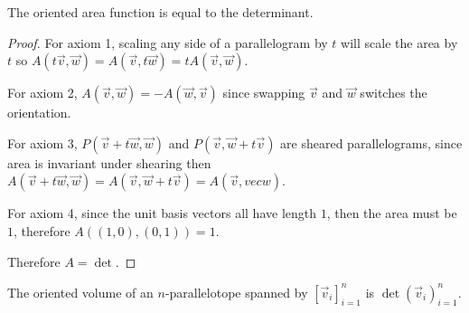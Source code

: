 \documentclass[notes]{subfiles}
\begin{document}
\begin{lemma}
    The oriented area function is equal to the determinant.
\end{lemma}
\begin{proof}
    For axiom 1, scaling any side of a parallelogram by $t$ will scale the area by $t$ so $A(t\vec{v}, \vec{w}) = A(\vec{v}, t\vec{w}) = tA(\vec{v}, \vec{w})$.

    For axiom 2, $A(\vec{v}, \vec{w}) = -A(\vec{w}, \vec{v})$ since swapping $\vec{v}$ and $\vec{w}$ switches the orientation.

    For axiom 3, $P(\vec{v} + t\vec{w}, \vec{w})$ and $P(\vec{v}, \vec{w} + t\vec{v})$ are sheared parallelograms, since area is invariant under shearing then $A(\vec{v} + t\vec{w}, \vec{w}) = A(\vec{v}, \vec{w} + t\vec{v}) = A(\vec{v},vec{w})$.

    For axiom 4, since the unit basis vectors all have length $1$, then the area must be $1$, therefore $A((1, 0), (0, 1)) = 1$.

    Therefore $A = \det$.
\end{proof}

\begin{theorem}
    The oriented volume of an $n$-parallelotope spanned by $[\vec{v}_i]_{i = 1}^n$ is $\det(\vec{v}_i)_{i = 1}^n$.
\end{theorem}
\end{document}
